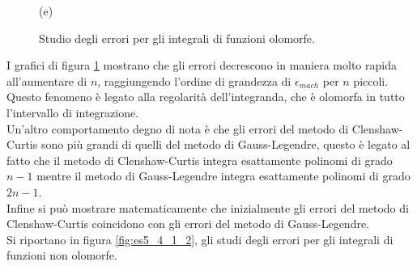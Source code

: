 \documentclass[letterpaper, 12pt]{article}
\begin{document}
\begin{figure}[!ht]
\begin{minipage}[b]{0.47\textwidth}
        \caption*{(e)}
    \end{minipage}
    \caption{Studio degli errori per gli integrali di funzioni olomorfe.}
    \label{fig:es5_4_1_1}
\end{figure}

I grafici di figura \ref{fig:es5_4_1_1} mostrano che gli errori decrescono in maniera molto rapida all'aumentare
di $n$, raggiungendo l'ordine di grandezza di $\epsilon_{mach}$ per $n$ piccoli. Questo fenomeno è legato 
alla regolarità dell'integranda, che è olomorfa in tutto l'intervallo di integrazione. \\
Un'altro comportamento degno di nota è che gli errori del metodo di Clenshaw-Curtis sono più grandi di quelli
del metodo di Gauss-Legendre, questo è legato al fatto che il metodo di Clenshaw-Curtis integra esattamente 
polinomi di grado $n-1$ mentre il metodo di Gauss-Legendre integra esattamente polinomi di grado $2n-1$. \\
Infine si può mostrare matematicamente che inizialmente gli errori del metodo di Clenshaw-Curtis coincidono
con gli errori del metodo di Gauss-Legendre. \\
Si riportano in figura \ref{fig:es5_4_1_2}, gli studi degli errori per gli integrali di funzioni non olomorfe.
\end{document}
